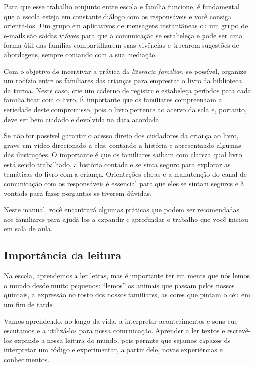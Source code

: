\documentclass[11pt]{extarticle}
\begin{document}
Para que esse trabalho conjunto entre escola e família funcione, é 
fundamental que a escola esteja em constante diálogo com os responsáveis e 
você consiga orientá-los. Um grupo em aplicativos de mensagens instantâneas ou um 
grupo de e-mails são saídas viáveis para que a comunicação se estabeleça e pode ser 
uma forma útil das famílias compartilharem suas vivências e trocarem sugestões 
de abordagens, sempre contando com a sua mediação. 

Com o objetivo de incentivar 
a prática da \textit{literacia familiar}, se possível, organize um rodízio entre os familiares 
das crianças para emprestar o livro da biblioteca da turma. Neste caso, crie um caderno 
de registro e estabeleça períodos para cada família ficar com o livro. É importante 
que os familiares compreendam a seriedade deste compromisso, pois o livro pertence 
ao acervo da sala e, portanto, deve ser bem cuidado e devolvido na data acordada. 

Se não for possível garantir o acesso direto dos cuidadores da criança ao livro, 
grave um vídeo direcionado a eles, contando a história e apresentando algumas 
das ilustrações. O importante é que os familiares saibam com clareza qual livro 
está sendo trabalhado, a história contada e se sinta seguro para explorar as temáticas 
do livro com a criança. Orientações claras e a manutenção do canal de comunicação com 
os responsáveis é essencial para que eles se sintam seguros e à vontade para fazer perguntas 
se tiverem dúvidas. 

Neste manual, você encontrará algumas práticas que podem ser 
recomendadas aos familiares para ajudá-los a expandir e aprofundar o trabalho 
que você iniciou em sala de aula.


\subsection{Importância da leitura}
Na escola, aprendemos a ler letras, mas é importante ter em mente que nós 
lemos o mundo desde muito pequenos: “lemos” os animais que passam pelos nossos 
quintais, a expressão no rosto dos nossos familiares, as cores que pintam o céu 
em um fim de tarde. 

Vamos aprendendo, ao longo da vida, a interpretar acontecimentos 
e sons que escutamos e a utilizá-los para nossa comunicação. Aprender a ler textos e 
escrevê-los expande a nossa leitura do mundo, pois permite que sejamos capazes de 
interpretar um código e experimentar, a partir dele, novas experiências e conhecimentos. 
\end{document}
